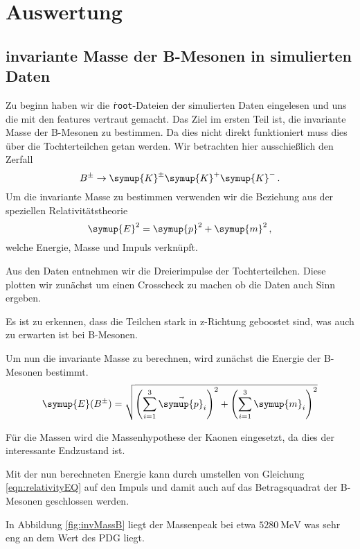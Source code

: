 \section{Auswertung}
\label{sec:auswertung}
\subsection{invariante Masse der B-Mesonen in simulierten Daten}

Zu beginn haben wir die \texttt{\.root}-Dateien der simulierten Daten eingelesen und uns die mit den features vertraut gemacht.
Das Ziel im ersten Teil ist, die invariante Masse der B-Mesonen zu bestimmen. Da dies nicht direkt funktioniert muss dies \"uber die Tochterteilchen getan werden.
Wir betrachten hier ausschie\ss lich den Zerfall
\begin{equation}
  B^{\pm} \to \symup{K}^{\pm} \symup{K}^{+} \symup{K}^{-}\,.
\end{equation}
Um die invariante Masse zu bestimmen verwenden wir die Beziehung aus der speziellen Relativit\"atstheorie
\begin{equation}
  \symup{E}^2 = \symup{p}^2 + \symup{m}^2\,,
  \label{eqn:relativityEQ}
\end{equation}
welche Energie, Masse und Impuls verkn\"upft.

Aus den Daten entnehmen wir die Dreierimpulse der Tochterteilchen.
Diese plotten wir zun\"achst um einen Crosscheck zu machen ob die Daten auch Sinn ergeben.


Es ist zu erkennen, dass die Teilchen stark in z-Richtung geboostet sind, was auch zu erwarten ist bei B-Mesonen.

Um nun die invariante Masse zu berechnen, wird zun\"achst die Energie der B-Mesonen bestimmt.
\begin{equation}
  \symup{E}(B^{\pm}) =
  \sqrt{\left(\sum_{i = 1}^{3} \vec{\symup{p}}_i\right)^2 + \left(\sum_{i = 1}^{3} \symup{m}_i\right)^2}
\end{equation}

F\"ur die Massen wird die Massenhypothese der Kaonen eingesetzt, da dies der interessante Endzustand ist.

Mit der nun berechneten Energie kann durch umstellen von Gleichung \eqref{eqn:relativityEQ} auf den Impuls und damit auch auf das Betragsquadrat der B-Mesonen geschlossen werden.

In Abbildung \ref{fig:invMassB} liegt der Massenpeak bei etwa $\SI{5280}{\mega\electronvolt}$ was sehr eng an dem Wert des PDG liegt.

